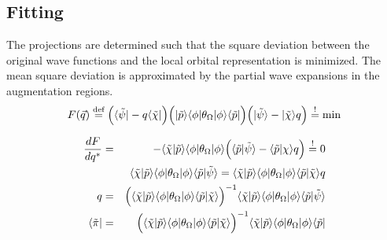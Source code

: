 \documentclass[11pt,a4paper]{report}
\begin{document}
\subsection{Fitting}
The projections are determined such that the square deviation between
the original wave functions and the local orbital representation is
minimized. The mean square deviation is approximated by the partial
wave expansions in the augmentation regions.
\begin{eqnarray}
F(\vec{q})\stackrel{\text{def}}{=} \Bigl(\langle\tilde{\psi}|-q\langle\tilde{\chi}|\Bigr)
\Bigl(|\tilde{p}\rangle\langle\phi|\theta_\Omega|\phi\rangle\langle\tilde{p}|\Bigr)
\Bigl(|\tilde{\psi}\rangle-|\tilde{\chi}\rangle q\Bigr)\stackrel{!}{=}\text{min}
\end{eqnarray}

\begin{eqnarray}
\frac{dF}{dq^*}&=&-\langle\tilde{\chi}|\tilde{p}\rangle
\langle\phi|\theta_\Omega|\phi\rangle
\Bigl(
\langle\tilde{p}|\tilde{\psi}\rangle-\langle\tilde{p}|\chi\rangle q\Bigr)
\stackrel{!}{=}0
\nonumber\\
%
%
%
&&\langle\tilde{\chi}|\tilde{p}\rangle
\langle\phi|\theta_\Omega|\phi\rangle
\langle\tilde{p}|\tilde{\psi}\rangle
=
\langle\tilde{\chi}|\tilde{p}\rangle
\langle\phi|\theta_\Omega|\phi\rangle
\langle\tilde{p}|\tilde\chi\rangle q
\nonumber\\
%
%
%
q&=&\Bigl(\langle\tilde{\chi}|\tilde{p}\rangle
\langle\phi|\theta_\Omega|\phi\rangle
\langle\tilde{p}|\tilde{\chi}\rangle\Bigr)^{-1}
\langle\tilde{\chi}|\tilde{p}\rangle
\langle\phi|\theta_\Omega|\phi\rangle
\langle\tilde{p}|\tilde{\psi}\rangle
\nonumber\\
%
%
%
\langle\tilde{\pi}|&=&
\Bigl(\langle\tilde{\chi}|\tilde{p}\rangle
\langle\phi|\theta_\Omega|\phi\rangle
\langle\tilde{p}|\tilde{\chi}\rangle\Bigr)^{-1}
\langle\tilde{\chi}|\tilde{p}\rangle
\langle\phi|\theta_\Omega|\phi\rangle
\langle\tilde{p}|
\label{eq:orbitalprojector}
\end{eqnarray}


\end{document}
